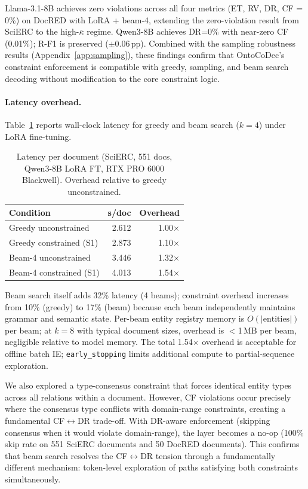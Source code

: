 Llama-3.1-8B achieves zero violations across all four metrics (ET, RV, DR, CF = 0\%) on DocRED with LoRA + beam-4, extending the zero-violation result from SciERC to the high-$\bar{\kappa}$ regime.
Qwen3-8B achieves DR=0\% with near-zero CF (0.01\%); R-F1 is preserved ($\pm$0.06\,pp).
Combined with the sampling robustness results (Appendix~\ref{app:sampling}), these findings confirm that OntoCoDec's constraint enforcement is compatible with greedy, sampling, and beam search decoding without modification to the core constraint logic.

\paragraph{Latency overhead.}
Table~\ref{tab:beam-latency} reports wall-clock latency for greedy and beam search ($k{=}4$) under LoRA fine-tuning.

\begin{table}[h]
\centering
\small
\begin{tabular}{@{}lrr@{}}
\toprule
\textbf{Condition} & \textbf{s/doc} & \textbf{Overhead} \\
\midrule
Greedy unconstrained   & 2.612 & 1.00$\times$ \\
Greedy constrained (S1)& 2.873 & 1.10$\times$ \\
Beam-4 unconstrained   & 3.446 & 1.32$\times$ \\
Beam-4 constrained (S1)& 4.013 & 1.54$\times$ \\
\bottomrule
\end{tabular}
\caption{Latency per document (SciERC, 551 docs, Qwen3-8B LoRA FT, RTX PRO 6000 Blackwell). Overhead relative to greedy unconstrained.}
\label{tab:beam-latency}
\end{table}

Beam search itself adds 32\% latency (4 beams); constraint overhead increases from 10\% (greedy) to 17\% (beam) because each beam independently maintains grammar and semantic state.
Per-beam entity registry memory is $O(|\text{entities}|)$ per beam; at $k{=}8$ with typical document sizes, overhead is ${<}$1\,MB per beam, negligible relative to model memory.
The total 1.54$\times$ overhead is acceptable for offline batch IE; \texttt{early\_stopping} limits additional compute to partial-sequence exploration.

We also explored a type-consensus constraint that forces identical entity types across all relations within a document.
However, CF violations occur precisely where the consensus type conflicts with domain-range constraints, creating a fundamental CF$\leftrightarrow$DR trade-off.
With DR-aware enforcement (skipping consensus when it would violate domain-range), the layer becomes a no-op (100\% skip rate on 551 SciERC documents and 50 DocRED documents).
This confirms that beam search resolves the CF$\leftrightarrow$DR tension through a fundamentally different mechanism: token-level exploration of paths satisfying both constraints simultaneously.


